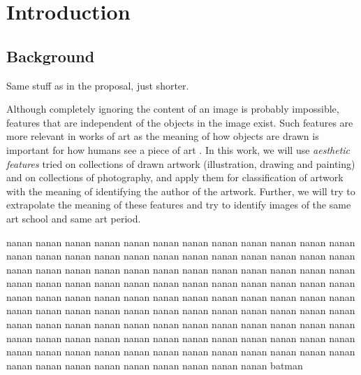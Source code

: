 \documentclass[11pt,a4paper,draft]{report}
\begin{document}
\chapter{Introduction}
\begin{multicols}{2}

\section{Background}

Same stuff as in the proposal, just shorter.

Although completely ignoring the content of an image is probably impossible,
features that are independent of the objects in the image exist.  Such features
are more relevant in works of art \cite{zirnhelt07art} as the meaning of how
objects are drawn is important for how humans see a piece of art
\cite{mach10clas}.  In this work, we will use \emph{aesthetic features} tried
on collections of drawn artwork (illustration, drawing and painting) and on
collections of photography, and apply them for classification of artwork with
the meaning of identifying the author of the artwork.  Further, we will try to
extrapolate the meaning of these features and try to identify images of the
same art school and same art period.

nanan nanan nanan nanan nanan nanan nanan nanan nanan nanan nanan nanan nanan
nanan nanan nanan nanan nanan nanan nanan nanan nanan nanan nanan nanan nanan
nanan nanan nanan nanan nanan nanan nanan nanan nanan nanan nanan nanan nanan
nanan nanan nanan nanan nanan nanan nanan nanan nanan nanan nanan nanan nanan
nanan nanan nanan nanan nanan nanan nanan nanan nanan nanan nanan nanan nanan
nanan nanan nanan nanan nanan nanan nanan nanan nanan nanan nanan nanan nanan
nanan nanan nanan nanan nanan nanan nanan nanan nanan nanan nanan nanan nanan
nanan nanan nanan nanan nanan nanan nanan nanan nanan nanan nanan nanan nanan
nanan nanan nanan nanan nanan nanan nanan nanan nanan nanan nanan nanan nanan
batman


\end{multicols}
\end{document}
